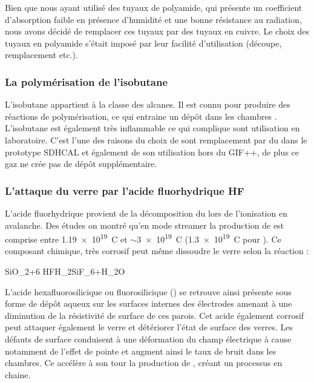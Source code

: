 Bien que nous ayant utilisé des tuyaux de polyamide, qui présente un coefficient d'absorption faible en présence d'humidité et une bonne résistance au radiation, nous avons décidé de remplacer ces tuyaux par des tuyaux en cuivre. Le choix des tuyaux en polyamide s'était imposé par leur facilité d'utilisation (découpe, remplacement etc.). 

\subsubsection{La polymérisation de l'isobutane}
 L'isobutane  appartient à la classe des alcanes. Il est connu pour produire des réactions de polymérisation, ce qui entraine un dépôt dans les chambres \cite{na60}. L'isobutane est également très inflammable ce qui complique sont utilisation en laboratoire. C'est l'une des raisons du choix de sont remplacement par du  dans le prototype SDHCAL et également de son utilisation hors du GIF++, de plus ce gaz ne crée pas de dépôt supplémentaire.

\subsubsection{L'attaque du verre par l'acide fluorhydrique HF}
L'acide fluorhydrique  provient de la décomposition du  lors de l'ionisation en avalanche. Des études on montré qu'en mode streamer la production de  est comprise entre \num{1.19e19}\si{\per\coulomb} \cite{Lu:2009zzd} et $\sim$\num{3e19}\si{\per\coulomb} \cite{Abbrescia:2006hk} (\num{1.3e19}\si{\per\coulomb} pour \cite{Aielli:2006ih}). Ce composant chimique, très corrosif peut même dissoudre le verre selon la réaction :
\begin{chemeqn}
SiO_2+6 HF\longrightarrow H_2SiF_6+H_2O
\end{chemeqn}
L'acide hexafluorosilicique ou fluorosilicique () se retrouve ainsi présente sous forme de dépôt aqueux sur les surfaces internes des électrodes amenant à une diminution de la résistivité de surface de ces parois. Cet acide également corrosif peut attaquer également le verre et détériorer l'état de surface des verres. Les défauts de surface conduisent à une déformation du champ électrique à cause notamment de l'effet de pointe et augment ainsi le taux de bruit dans les chambres. Ce accélère à son tour la production de , créant un processus en chaine.

